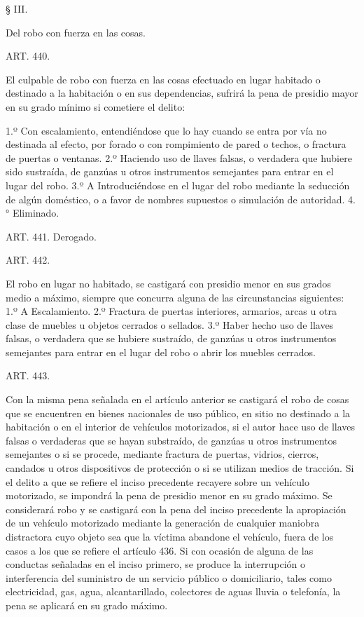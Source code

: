     § III.

    Del robo con fuerza en las cosas.


    ART. 440.

    El culpable de robo con fuerza en las cosas efectuado en lugar habitado o destinado a la habitación o en sus dependencias, sufrirá la pena de presidio mayor en su grado mínimo si cometiere el delito:

    1.º Con escalamiento, entendiéndose que lo hay cuando se entra por vía no destinada al efecto, por forado o con rompimiento de pared o techos, o fractura de puertas o ventanas.
    2.º Haciendo uso de llaves falsas, o verdadera que hubiere sido sustraída, de ganzúas u otros instrumentos semejantes para entrar en el lugar del robo.
    3.º A Introduciéndose en el lugar del robo mediante la seducción de algún doméstico, o a favor de nombres supuestos o simulación de autoridad.
    4.° Eliminado.

    ART. 441.    Derogado.


    ART. 442.

    El robo en lugar no habitado, se castigará con presidio menor en sus grados medio a máximo, siempre que concurra alguna de las circunstancias siguientes:
    1.º A Escalamiento.
    2.º Fractura de puertas interiores, armarios, arcas u otra clase de muebles u objetos cerrados o sellados.
    3.º Haber hecho uso de llaves falsas, o verdadera que se hubiere sustraído, de ganzúas u otros instrumentos semejantes para entrar en el lugar del robo o abrir los muebles cerrados.


   
    ART. 443.

    Con la misma pena señalada en el artículo anterior se castigará el robo de cosas que se encuentren en bienes nacionales de uso público, en sitio no destinado a la habitación o en el interior de vehículos motorizados, si el autor hace uso de llaves falsas o verdaderas que se hayan substraído, de ganzúas u otros instrumentos semejantes o si se procede, mediante fractura de puertas, vidrios, cierros, candados u otros dispositivos de protección o si se utilizan medios de tracción.
    Si el delito a que se refiere el inciso precedente recayere sobre un vehículo motorizado, se impondrá la pena de presidio menor en su grado máximo.
    Se considerará robo y se castigará con la pena del inciso precedente la apropiación de un vehículo motorizado mediante la generación de cualquier maniobra distractora cuyo objeto sea que la víctima abandone el vehículo, fuera de los casos a los que se refiere el artículo 436.
    Si con ocasión de alguna de las conductas señaladas en el inciso primero, se produce la interrupción o interferencia del suministro de un servicio público o domiciliario, tales como electricidad, gas, agua, alcantarillado, colectores de aguas lluvia o telefonía, la pena se aplicará en su grado máximo.


